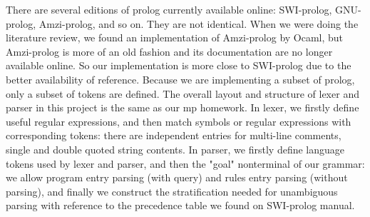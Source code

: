 There are several editions of prolog currently available online: SWI-prolog, GNU-prolog, Amzi-prolog, and so on. They are not identical. When we were doing the literature review, we found an implementation of Amzi-prolog by Ocaml, but Amzi-prolog is more of an old fashion and its documentation are no longer available online. So our implementation is more close to SWI-prolog due to the better availability of reference. Because we are implementing a subset of prolog, only a subset of tokens are defined.
The overall layout and structure of lexer and parser in this project is the same as our mp homework. In lexer, we firstly define useful regular expressions, and then match symbols or regular expressions with corresponding tokens: there are independent entries for multi-line comments, single and double quoted string contents. In parser, we firstly define language tokens used by lexer and parser, and then the "goal" nonterminal of our grammar: we allow program entry parsing (with query) and rules entry parsing (without parsing), and finally we construct the stratification needed for unambiguous parsing with reference to the precedence table we found on SWI-prolog manual.


